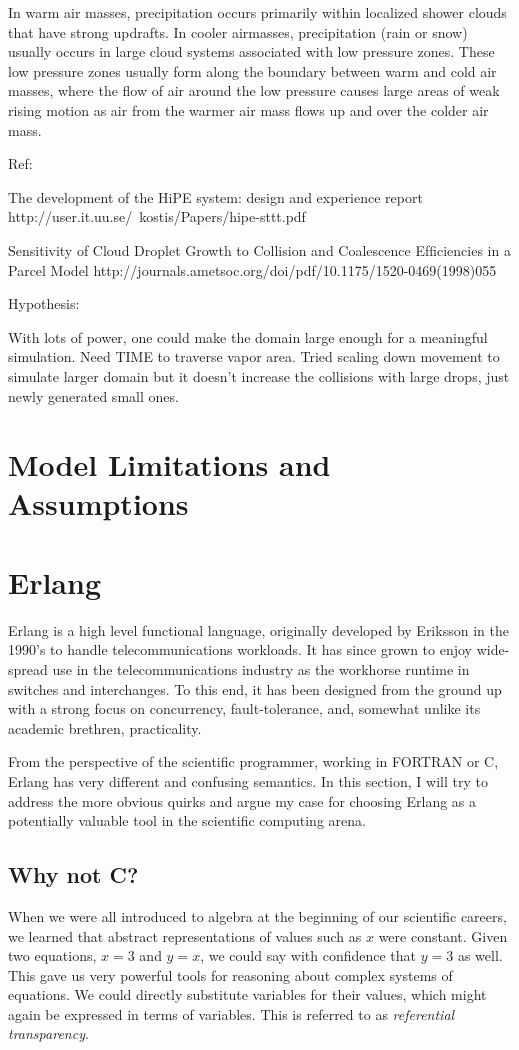 \documentclass[twocolumn,a4paper,10pt]{article}
\begin{document}
In warm air masses, precipitation occurs primarily within localized shower
clouds that have strong updrafts. In cooler airmasses, precipitation (rain or
snow) usually occurs in large cloud systems associated with low pressure zones.
These low pressure zones usually form along the boundary between warm and cold
air masses, where the flow of air around the low pressure causes large areas of
weak rising motion as air from the warmer air mass flows up and over the colder
air mass.

Ref:

The development of the HiPE system:
design and experience report
http://user.it.uu.se/~kostis/Papers/hipe-sttt.pdf

Sensitivity of Cloud Droplet Growth to Collision and Coalescence Efﬁciencies in a
Parcel Model
http://journals.ametsoc.org/doi/pdf/10.1175/1520-0469(1998)055%

Hypothesis:

With lots of power, one could make the domain large enough for a meaningful simulation. Need TIME to traverse vapor area. Tried scaling down movement to simulate larger domain but it doesn’t increase the collisions  with large drops, just newly generated small ones.

\section{Model Limitations and Assumptions}

\section{Erlang}
Erlang is a high level functional language, originally developed by Eriksson in the 1990's to handle telecommunications workloads. It has since grown to enjoy wide-spread use in the telecommunications industry as the workhorse runtime in switches and interchanges. To this end, it has been designed from the ground up with a strong focus on concurrency, fault-tolerance, and, somewhat unlike its academic brethren, practicality.

From the perspective of the scientific programmer, working in FORTRAN or C, Erlang has very different and confusing semantics. In this section, I will try to address the more obvious quirks and argue my case for choosing Erlang as a potentially valuable tool in the scientific computing arena.

\subsection{Why not C?}
When we were all introduced to algebra at the beginning of our scientific careers, we learned that abstract representations of values such as $x$ were constant. Given two equations, $x = 3$ and $y = x$, we could say with confidence that $y = 3$ as well. This gave us very powerful tools for reasoning about complex systems of equations. We could directly substitute variables for their values, which might again be expressed in terms of variables. This is referred to as \emph{referential transparency}.
\end{document}
